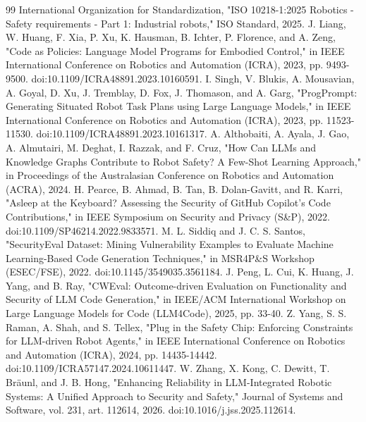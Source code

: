 \documentclass{ieeeaccess}
\begin{document}
\begin{thebibliography}{99}
 International Organization for Standardization, "ISO 10218-1:2025 Robotics - Safety requirements - Part 1: Industrial robots," ISO Standard, 2025.
 J. Liang, W. Huang, F. Xia, P. Xu, K. Hausman, B. Ichter, P. Florence, and A. Zeng, "Code as Policies: Language Model Programs for Embodied Control," in IEEE International Conference on Robotics and Automation (ICRA), 2023, pp. 9493-9500. doi:10.1109/ICRA48891.2023.10160591.
 I. Singh, V. Blukis, A. Mousavian, A. Goyal, D. Xu, J. Tremblay, D. Fox, J. Thomason, and A. Garg, "ProgPrompt: Generating Situated Robot Task Plans using Large Language Models," in IEEE International Conference on Robotics and Automation (ICRA), 2023, pp. 11523-11530. doi:10.1109/ICRA48891.2023.10161317.
 A. Althobaiti, A. Ayala, J. Gao, A. Almutairi, M. Deghat, I. Razzak, and F. Cruz, "How Can LLMs and Knowledge Graphs Contribute to Robot Safety? A Few-Shot Learning Approach," in Proceedings of the Australasian Conference on Robotics and Automation (ACRA), 2024.
 H. Pearce, B. Ahmad, B. Tan, B. Dolan-Gavitt, and R. Karri, "Asleep at the Keyboard? Assessing the Security of GitHub Copilot's Code Contributions," in IEEE Symposium on Security and Privacy (S\&P), 2022. doi:10.1109/SP46214.2022.9833571.
 M. L. Siddiq and J. C. S. Santos, "SecurityEval Dataset: Mining Vulnerability Examples to Evaluate Machine Learning-Based Code Generation Techniques," in MSR4P\&S Workshop (ESEC/FSE), 2022. doi:10.1145/3549035.3561184.
 J. Peng, L. Cui, K. Huang, J. Yang, and B. Ray, "CWEval: Outcome-driven Evaluation on Functionality and Security of LLM Code Generation," in IEEE/ACM International Workshop on Large Language Models for Code (LLM4Code), 2025, pp. 33-40.
 Z. Yang, S. S. Raman, A. Shah, and S. Tellex, "Plug in the Safety Chip: Enforcing Constraints for LLM-driven Robot Agents," in IEEE International Conference on Robotics and Automation (ICRA), 2024, pp. 14435-14442. doi:10.1109/ICRA57147.2024.10611447.
 W. Zhang, X. Kong, C. Dewitt, T. Br\"{a}unl, and J. B. Hong, "Enhancing Reliability in LLM-Integrated Robotic Systems: A Unified Approach to Security and Safety," Journal of Systems and Software, vol. 231, art. 112614, 2026. doi:10.1016/j.jss.2025.112614.

\end{thebibliography}
\end{document}
